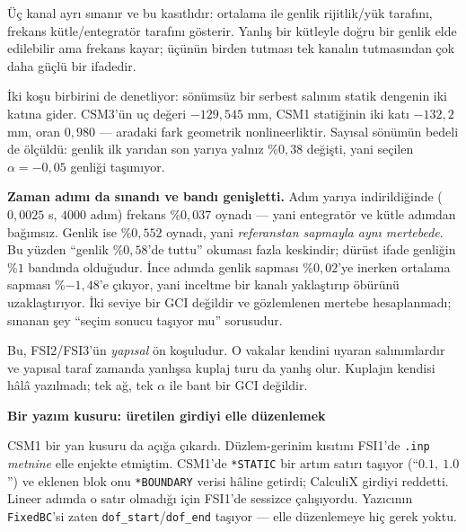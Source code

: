 \documentclass[11pt,a4paper]{article}
\newcommand{\kkkenar}{lacivert}
\newcommand{\kkzemin}{kod}
\newenvironment{renkkutu}[3]{%
  \renewcommand{\kkkenar}{#1}\renewcommand{\kkzemin}{#2}%
  \par\medskip\noindent
  \begin{lrbox}{\kutugovde}%
  \begin{minipage}{\dimexpr\linewidth-2\fboxsep-2\fboxrule\relax}\footnotesize
  \textcolor{#1}{\textbf{#3}}\par\vspace{3pt}%
}{%
  \end{minipage}%
  \end{lrbox}%
  \noindent\fcolorbox{\kkkenar}{\kkzemin}{\usebox{\kutugovde}}%
  \par\medskip
}
\newenvironment{dikkat}[1]{\begin{renkkutu}{orta}{ortabg}{#1}}{\end{renkkutu}}
\begin{document}
\begin{description}
        \noindent Üç kanal ayrı sınanır ve bu kasıtlıdır: ortalama ile
        genlik rijitlik/yük tarafını, frekans kütle/entegratör tarafını
        gösterir. Yanlış bir kütleyle doğru bir genlik elde edilebilir ama
        frekans kayar; üçünün birden tutması tek kanalın tutmasından çok
        daha güçlü bir ifadedir.

        \noindent İki koşu birbirini de denetliyor: sönümsüz bir serbest
        salınım statik dengenin iki katına gider. CSM3'ün uç değeri
        $-129{,}545$ mm, CSM1 statiğinin iki katı $-132{,}2$ mm, oran
        $0{,}980$ --- aradaki fark geometrik nonlineerliktir. Sayısal
        sönümün bedeli de ölçüldü: genlik ilk yarıdan son yarıya yalnız
        \%$0{,}38$ değişti, yani seçilen $\alpha = -0{,}05$ genliği
        taşımıyor.

        \noindent \textbf{Zaman adımı da sınandı ve bandı genişletti.}
        Adım yarıya indirildiğinde ($0{,}0025$ s, $4000$ adım) frekans
        \%$0{,}037$ oynadı --- yani entegratör ve kütle adımdan bağımsız.
        Genlik ise \%$0{,}552$ oynadı, yani \emph{referanstan sapmayla aynı
        mertebede}. Bu yüzden ``genlik \%$0{,}58$'de tuttu'' okuması fazla
        keskindir; dürüst ifade genliğin \%$1$ bandında olduğudur. İnce
        adımda genlik sapması \%$0{,}02$'ye inerken ortalama sapması
        \%$-1{,}48$'e çıkıyor, yani inceltme bir kanalı yaklaştırıp
        öbürünü uzaklaştırıyor. İki seviye bir GCI değildir ve gözlemlenen
        mertebe hesaplanmadı; sınanan şey ``seçim sonucu taşıyor mu''
        sorusudur.

        \noindent Bu, FSI2/FSI3'ün \emph{yapısal} ön koşuludur. O vakalar
        kendini uyaran salınımlardır ve yapısal taraf zamanda yanlışsa
        kuplaj turu da yanlış olur. Kuplajın kendisi hâlâ yazılmadı; tek
        ağ, tek $\alpha$ ile bant bir GCI değildir.

        \begin{dikkat}{Bir yazım kusuru: üretilen girdiyi elle düzenlemek}
        CSM1 bir yan kusuru da açığa çıkardı. Düzlem-gerinim kısıtını
        FSI1'de \texttt{.inp} \emph{metnine} elle enjekte etmiştim. CSM1'de
        \texttt{*STATIC} bir artım satırı taşıyor (``$0.1,\ 1.0$'') ve
        eklenen blok onu \texttt{*BOUNDARY} verisi hâline getirdi;
        CalculiX girdiyi reddetti. Lineer adımda o satır olmadığı için
        FSI1'de sessizce çalışıyordu. Yazıcının \texttt{FixedBC}'si zaten
        \texttt{dof\_start}/\texttt{dof\_end} taşıyor --- elle düzenlemeye
        hiç gerek yoktu.


\end{dikkat}
\end{description}
\end{document}
